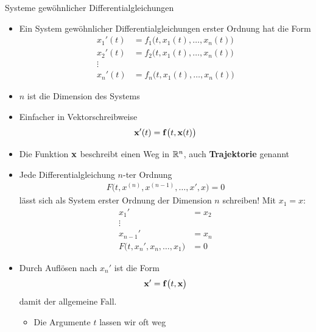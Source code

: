 \begin{frame}{Systeme gewöhnlicher Differentialgleichungen}
  \begin{itemize}
  \item Ein System gewöhnlicher
    Differentialgleichungen erster Ordnung hat die Form
    \begin{align*}
      x_1'(t) &= f_1\bigl(t,x_1(t),\dots,x_n(t) \bigr)\\
      x_2'(t) &= f_2\bigl(t,x_1(t),\dots,x_n(t) \bigr)\\
      \vdots\\
      x_n'(t) &= f_n\bigl(t,x_1(t),\dots,x_n(t) \bigr)
    \end{align*}
  \item  $n$ ist die Dimension des Systems
  \item Einfacher in Vektorschreibweise
    \begin{gather*}
      \mathbf{x}'(t) = \mathbf{f}\bigl(t,\mathbf{x}(t)\bigr)
    \end{gather*}
  \item Die Funktion $\mathbf{x}$ beschreibt einen Weg in $\mathbb R^n$, auch \textbf{Trajektorie} genannt
  \end{itemize}
\end{frame}

\begin{frame}
  \begin{itemize}
  \item   Jede Differentialgleichung $n$-ter Ordnung
    \begin{gather*}
      F\bigl(t,x^{(n)},x^{(n-1)},\dots,x',x\bigr) = 0
    \end{gather*}
    lässt sich als System erster Ordnung der Dimension
    $n$ schreiben! Mit $x_1=x$:
    \begin{align*}
      x_1' &= x_2\\
      \vdots\\
      x_{n-1}' &= x_n\\
      F\bigl(t,x_n', x_n,\dots,x_1\bigr)&=0 
    \end{align*}
  \item Durch Auflösen nach $x_n'$ ist die Form
    \begin{gather*}
      \mathbf{x}' = \mathbf{f}\bigl(t,\mathbf{x}\bigr)    
    \end{gather*}
    damit der allgemeine Fall.
    \begin{itemize}
    \item Die Argumente \glqq$t$\grqq{} lassen wir oft weg
    \end{itemize}
  \end{itemize}
\end{frame}

